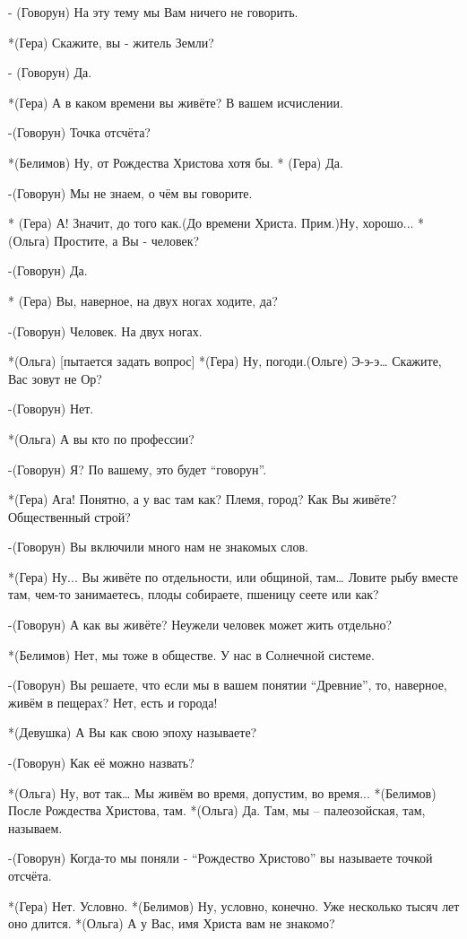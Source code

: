 - (Говорун) На эту тему мы Вам ничего не говорить.

*(Гера) Скажите, вы - житель Земли?

- (Говорун) Да.

*(Гера) А в каком времени вы живёте? В вашем исчислении.

-(Говорун) Точка отсчёта?

*(Белимов) Ну, от Рождества Христова хотя бы.
* (Гера) Да.

-(Говорун) Мы не знаем, о чём вы говорите.

* (Гера) А! Значит, до того как.(До времени Христа. Прим.)Ну, хорошо...
* (Ольга) Простите, а Вы - человек?

-(Говорун) Да.

* (Гера) Вы, наверное, на двух ногах ходите, да?

-(Говорун) Человек.  На двух ногах.

*(Ольга) [пытается задать вопрос]
*(Гера) Ну, погоди.(Ольге) Э-э-э… Скажите, Вас зовут не Ор?

-(Говорун) Нет.

*(Ольга) А вы кто по профессии?

-(Говорун) Я? По вашему,  это будет “говорун”.

*(Гера) Ага! Понятно, а у вас там как? Племя, город? Как Вы живёте? Общественный строй?

-(Говорун) Вы включили много нам не знакомых слов.

*(Гера) Ну... Вы живёте по отдельности, или общиной, там… Ловите рыбу вместе там, чем-то занимаетесь, плоды собираете, пшеницу сеете или как? 

-(Говорун) А как вы живёте? Неужели человек может жить отдельно?

*(Белимов) Нет, мы тоже в обществе. У нас в Солнечной системе.

-(Говорун) Вы решаете, что если мы в вашем понятии “Древние”, то, наверное, живём в пещерах? Нет, есть и города!

*(Девушка) А Вы как свою эпоху называете?

-(Говорун) Как её можно назвать?

*(Ольга) Ну, вот так… Мы живём во время, допустим, во время...
*(Белимов) После Рождества Христова, там.
*(Ольга) Да. Там, мы – палеозойская, там, называем.

-(Говорун) Когда-то мы поняли  -  “Рождество Христово” вы называете точкой отсчёта. 

*(Гера) Нет. Условно.
*(Белимов) Ну, условно, конечно. Уже несколько тысяч лет оно длится. 
*(Ольга) А у Вас, имя Христа вам не знакомо?

